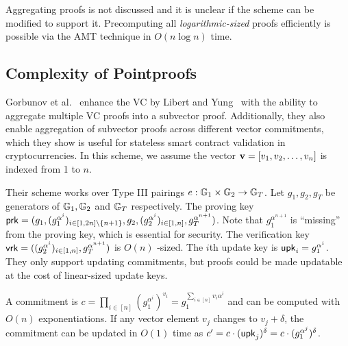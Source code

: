 Aggregating proofs is not discussed and it is unclear if the scheme can be modified to support it.
Precomputing all \textit{logarithmic-sized} proofs efficiently is possible via the AMT technique in $O(n\log{n})$ time.

\subsection{Complexity of Pointproofs~\cite{GRWZ20,LY10}}
\label{s:complexity:pointproofs}
Gorbunov et al.~\cite{GRWZ20} enhance the VC by Libert and Yung~\cite{LY10} with the ability to aggregate multiple VC proofs into a subvector proof.
Additionally, they also enable aggregation of subvector proofs across different vector commitments, which they show is useful for stateless smart contract validation in cryptocurrencies.
In this scheme, we assume the vector $\bm{\mathrm{v}}=[v_1, v_2, \dots, v_n]$ is indexed from 1 to $n$.

Their scheme works over Type III pairings $e : \mathbb{G}_1 \times \mathbb{G}_2\rightarrow \mathbb{G}_T$.
Let $g_1,g_2,g_T$ be generators of $\mathbb{G}_1, \mathbb{G}_2$ and $\mathbb{G}_T$ respectively.
The proving key $\mathsf{prk} = (g_1, (g_1^{\alpha^i})_{i\in[1,2n]\setminus\{n+1\}},g_2,(g_2^{\alpha^i})_{i\in[1,n]}, g_T^{\alpha^{n+1}})$.
Note that $g_1^{\alpha^{n+1}}$ is ``missing'' from the proving key, which is essential for security.
The verification key $\mathsf{vrk}=((g_2^{\alpha^i})_{i\in[1,n]},g_T^{\alpha^{n+1}})$ is $O(n)$ -sized.
The $i$th update key is $\mathsf{upk}_i=g_1^{\alpha^i}$.
They only support updating commitments, but proofs could be made updatable at the cost of linear-sized update keys.

A commitment is $c=\prod_{i\in[n]} \left(g_1^{\alpha^i}\right)^{v_i}=g_1^{\sum_{i\in [n]} v_i\alpha^i}$ and can be computed with $O(n)$ exponentiations.
If any vector element $v_j$ changes to $v_j + \delta$, the commitment can be updated in $O(1)$ time as $c' = c \cdot (\mathsf{upk}_j)^{\delta} = c\cdot (g_1^{\alpha^j})^{\delta}$.

